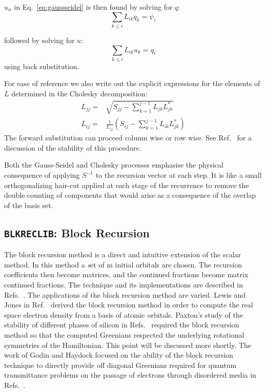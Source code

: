 $u_{n}$ in Eq.~\ref{eq:gaussseidel} is then found by solving for $q$:
%
\begin{equation}
\sum_{k\leq i} L_{ik}q_{k} = \psi_{i}
\end{equation}
%

followed by solving for $u$:
%
\begin{equation}
\sum_{k\leq i} L_{ik}u_{k} = q_{i}
\end{equation}
%
using back substitution. 

For ease of reference we also write out the explicit expressions 
for the elements of $L$ determined in the Cholesky decomposition:
%
\begin{align}
L_{jj} =& \sqrt{S_{jj} - \sum_{k=1}^{j-1}L_{jk}L^{*}_{jk}}\\
L_{ij} =& \frac{1}{L_{jj}}(S_{ij}-\sum_{k=1}^{j-1}L_{ik}L^{*}_{jk})
\end{align}
%
The forward substitution can proceed column wise or row wise. 
See Ref.~\cite{wilkinson68} for a discussion of the stability 
of this procedure.

Both the Gauss-Seidel and Cholesky processes emphasise the physical consequence
of applying $S^{-1}$ to the recursion vector at each step.
It is like a small orthogonalizing hair-cut applied at each stage of the recurrence
to remove the double counting of components that would arise 
as a consequence of the overlap of the basis set. 

\subsection{\texttt{BLKRECLIB}: Block Recursion}
The block recursion method is a direct and intuitive extension of the scalar method.
In this method a {\emph set of m} initial orbitals are chosen. The recursion
coefficients then become matrices, and the continued fractions become
matrix continued fractions. The technique and its implementations are described 
in Refs.~\cite{jones84, legrand85, inoue87, nex89, godin91}. 
The applications of the block recursion method are varied.
Lewis and Jones in Ref.~\cite{jones84} derived the block recursion method
in order to compute the real space electron density from a basis of atomic orbitals.
Paxton's study of the stability of different phases of silicon in 
Refs.~\cite{paxton87, paxton88} required the block recursion method so that
the computed Greenians respected the underlying rotational symmetries of the 
Hamiltonian. This point will be discussed more shortly. The work of 
Godin and Haydock focused on the ability of the block recursion technique
to directly provide off diagonal Greenians required for quantum transmittance problems
on the passage of electrons through disordered media in Refs.~\cite{godin86, godin88}. 

